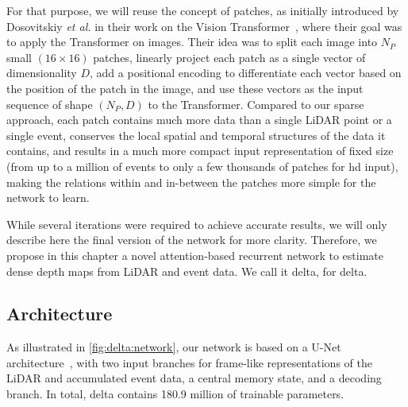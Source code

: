 For that purpose, we will reuse the concept of patches, as initially introduced by Dosovitskiy \textit{et al.} in their work on the Vision Transformer~\cite{Dosovitskiy2020AnII}, where their goal was to apply the Transformer on images. Their idea was to split each image into \(N_P\) small \((16\times{}16)\) patches, linearly project each patch as a single vector of dimensionality \(D\), add a positional encoding to differentiate each vector based on the position of the patch in the image, and use these vectors as the input sequence of shape \((N_P, D)\) to the Transformer. Compared to our sparse approach, each patch contains much more data than a single LiDAR point or a single event, conserves the local spatial and temporal structures of the data it contains, and results in a much more compact input representation of fixed size (from up to a million of events to only a few thousands of patches for \acrshort{hd} input), making the relations within and in-between the patches more simple for the network to learn.

While several iterations were required to achieve accurate results, we will only describe here the final version of the network for more clarity. Therefore, we propose in this chapter a novel attention-based recurrent network to estimate dense depth maps from LiDAR and event data. We call it \acrshort{delta}, for \acrlong{delta}.


\subsection{Architecture}\label{sec:delta:method:architecture}
As illustrated in \cref{fig:delta:network}, our network is based on a U-Net architecture~\cite{Ronneberger2015UNetCN}, with two input branches for frame-like representations of the LiDAR and accumulated event data, a central memory state, and a decoding branch. In total, \acrshort{delta} contains 180.9 million of trainable parameters.

